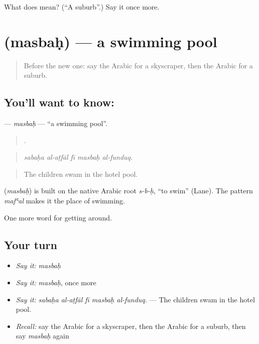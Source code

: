 \begin{tcolorbox}[breakable,colback=teal!4,colframe=teal!35!black,title={Before you move on}]
What does  mean? (\textquotedblleft{}A suburb\textquotedblright{}.) Say it once more.
\end{tcolorbox}
\section[\texorpdfstring{\ar{مسبح} (masbaḥ)}{مسبح (masbaḥ)}]{ (masbaḥ) — a swimming pool}

\label{lesson:AR-C454-masbah}



\begin{quote}
Before the new one: say the Arabic for a skyscraper, then the Arabic for a suburb.
\end{quote}

\subsection*{You'll want to know: }
\textbf{} — \emph{masbaḥ} — \textquotedblleft{}a swimming pool\textquotedblright{}.

\begin{quote}
    .
\end{quote}

\begin{quote}
\emph{sabaḥa al-aṭfāl fī masbaḥ al-funduq.}
\end{quote}

\begin{quote}
The children swam in the hotel pool.
\end{quote}

\begin{cousinweb}
\textbf{} (\emph{masbaḥ}) is built on the native Arabic root \emph{s-b-ḥ}, \textquotedblleft{}to swim\textquotedblright{} (Lane). The pattern \emph{mafʿal} makes it the place of swimming.
\end{cousinweb}

\begin{grammarlens}[title={What you've built}]
One more word for getting around.
\end{grammarlens}

\subsection*{Your turn}
\begin{itemize}
\raggedright
  \item \emph{Say it:} \emph{masbaḥ}
  \item \emph{Say it:} \emph{masbaḥ}, once more
  \item \emph{Say it:} \emph{sabaḥa al-aṭfāl fī masbaḥ al-funduq.} — The children swam in the hotel pool.
  \item \emph{Recall:} say the Arabic for a skyscraper, then the Arabic for a suburb, then say \emph{masbaḥ} again
\end{itemize}

